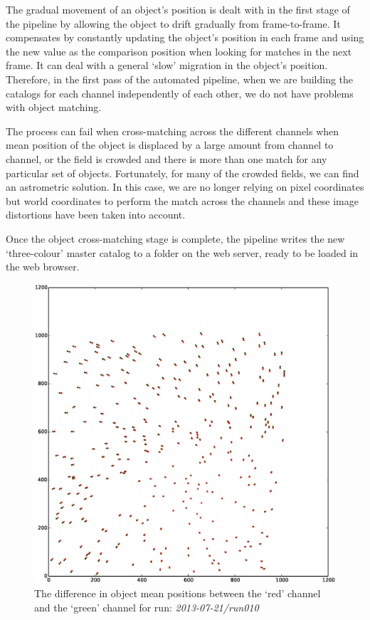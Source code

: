 The gradual movement of an object's position is dealt with in the first stage of the pipeline by allowing the object to drift gradually from frame-to-frame. It compensates by constantly updating the object's position in each frame and using the new value as the comparison position when looking for matches in the next frame. It can deal with a general `slow' migration in the object's position. Therefore, in the first pass of the automated pipeline, when we are building the catalogs for each channel independently of each other, we do not have problems with object matching. 

The process can fail when cross-matching across the different channels when mean position of the object is displaced by a large amount from channel to channel, or the field is crowded and there is more than one match for any particular set of objects. Fortunately, for many of the crowded fields, we can find an astrometric solution. In this case, we are no longer relying on pixel coordinates but world coordinates to perform the match across the channels and these image distortions have been taken into account. 

Once the object cross-matching stage is complete, the pipeline writes the new `three-colour' master catalog to a folder on the web server, ready to be loaded in the web browser. 

\begin{figure}
  \centering
  \includegraphics[width=\textwidth]{images/objectOffset_run010_g.eps}
  \caption{The difference in object mean positions between the `red' channel and the `green' channel for run: \emph{2013-07-21/run010} }
\label{fig:greenblueoffset}
\end{figure}


